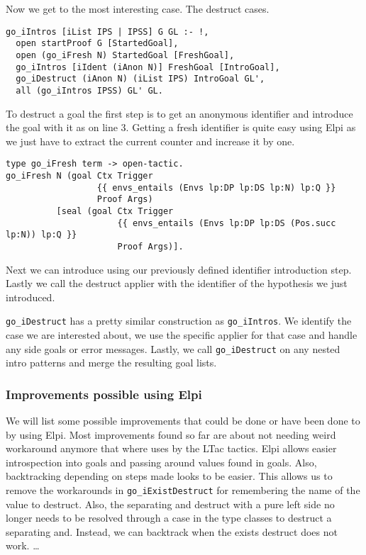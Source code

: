 \documentclass[thesis.tex]{subfiles}
\begin{document}
{{{Now we get to the most interesting case. The destruct cases.
\begin{verbatim}
go_iIntros [iList IPS | IPSS] G GL :- !,
  open startProof G [StartedGoal],
  open (go_iFresh N) StartedGoal [FreshGoal],
  go_iIntros [iIdent (iAnon N)] FreshGoal [IntroGoal],
  go_iDestruct (iAnon N) (iList IPS) IntroGoal GL',
  all (go_iIntros IPSS) GL' GL.
\end{verbatim}
To destruct a goal the first step is to get an anonymous identifier and introduce the goal with it as on line 3. Getting a fresh identifier is quite easy using Elpi as we just have to extract the current counter and increase it by one.
\begin{verbatim}
type go_iFresh term -> open-tactic.
go_iFresh N (goal Ctx Trigger 
                  {{ envs_entails (Envs lp:DP lp:DS lp:N) lp:Q }} 
                  Proof Args) 
          [seal (goal Ctx Trigger 
                      {{ envs_entails (Envs lp:DP lp:DS (Pos.succ lp:N)) lp:Q }} 
                      Proof Args)].
\end{verbatim}
Next we can introduce using our previously defined identifier introduction step. Lastly we call the destruct applier with the identifier of the hypothesis we just introduced.

\texttt{go_iDestruct} has a pretty similar construction as \texttt{go_iIntros}. We identify the case we are interested about, we use the specific applier for that case and handle any side goals or error messages. Lastly, we call \texttt{go_iDestruct} on any nested intro patterns and merge the resulting goal lists.

\subsubsection*{Improvements possible using Elpi}
We will list some possible improvements that could be done or have been done to by using Elpi. Most improvements found so far are about not needing weird workaround anymore that where uses by the LTac tactics. Elpi allows easier introspection into goals and passing around values found in goals. Also, backtracking depending on steps made looks to be easier. This allows us to remove the workarounds in \texttt{go_iExistDestruct} for remembering the name of the value to destruct. Also, the separating and destruct with a pure left side no longer needs to be resolved through a case in the type classes to destruct a separating and. Instead, we can backtrack when the exists destruct does not work.
\dots

}}}
\end{document}
